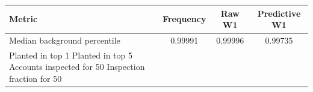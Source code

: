 \begin{tabular}{lccc}
\toprule
Metric & Frequency & Raw W1 & Predictive W1 \\
\midrule
Median background percentile & 0.99991 & 0.99996 & 0.99735 \\
Planted in top 1%
Planted in top 5%
Accounts inspected for 50%
Inspection fraction for 50%
\bottomrule
\end{tabular}
